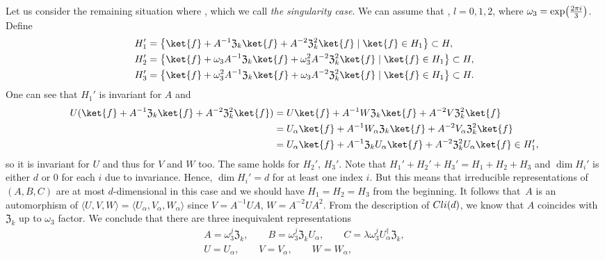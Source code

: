 \documentclass[11pt]{article}
\numberwithin{equation}{section}
\numberwithin{equation}{section}
\newcommand{\la}{\langle}
\newcommand{\ra}{\rangle}
\begin{document}
Let us consider the remaining situation
where ,
which we call \textit{the singularity case}.
We can assume that , $l=0,1,2$,
where $\omega_3 = \exp\bigl(\frac{2\pi{\rm i}}{3}\bigr)$. Define
\begin{align*}
& H_1' = \bigl\{\ket{f} + A^{-1}\mathfrak{Z}_k\ket{f} + A^{-2}\mathfrak{Z}_k^{2}\ket{f} \mid  \ket{f} \in H_1 \bigr\} \subset H, \\
 &H_2' = \bigl\{\ket{f} + \omega_3A^{-1}\mathfrak{Z}_k\ket{f} + \omega_3^2A^{-2}\mathfrak{Z}_k^{2}\ket{f} \mid  \ket{f} \in H_1 \bigr\} \subset H, \\
& H_3' = \bigl\{\ket{f} + \omega_3^2A^{-1}\mathfrak{Z}_k\ket{f} + \omega_3A^{-2}\mathfrak{Z}_k^{2}\ket{f} \mid  \ket{f} \in H_1 \bigr\} \subset H.
\end{align*}
One can see that $H_1'$ is invariant for $A$
and
\begin{align*}
 U(\ket{f} + A^{-1}\mathfrak{Z}_k\ket{f} + A^{-2}\mathfrak{Z}_k^{2}\ket{f})
 &= U \ket{f} + A^{-1}W\mathfrak{Z}_k\ket{f} + A^{-2}V\mathfrak{Z}_k^{2}\ket{f} \\
 &= U_\alpha \ket{f} + A^{-1}W_\alpha\mathfrak{Z}_k\ket{f} + A^{-2}V_\alpha\mathfrak{Z}_k^{2}\ket{f}\\
& = U_\alpha \ket{f} + A^{-1}\mathfrak{Z}_kU_\alpha\ket{f} + A^{-2}\mathfrak{Z}_k^{2}U_\alpha\ket{f}
 \in H_1',
\end{align*}
so it is invariant for $U$ and thus for $V$ and $W$ too. The same holds
for $H_2'$, $H_3'$. Note that $H_1'+H_2'+H_3' = H_1+H_2+H_3$ and $\dim H_i'$ is
either $d$ or $0$ for each $i$ due to invariance.
Hence, $\dim H_i' = d$ for at least one index $i$.
But this means that irreducible representations of $(A,B,C)$
are at most $d$-dimensional in this case and we should have $H_1=H_2=H_3$
from the beginning.
It follows that~$A$ is an automorphism of $\la U, V, W\ra = \la U_\alpha, V_\alpha, W_\alpha\ra$
since $V = A^{-1}UA$, $W = A^{-2}UA^2$.
From the description of ${\rm Cli}(d)$, we know that $A$ coincides with $\mathfrak{Z}_k$ up to $\omega_3$ factor.
We conclude that there are three inequivalent representations
\begin{gather}
 A = \omega_3^j \mathfrak{Z}_k,
 \qquad B = \omega_3^j \mathfrak{Z}_k U_\alpha,
\qquad C = \lambda \omega_3^j U_\alpha^\dag \mathfrak{Z}_k,\nonumber \\
 U = U_\alpha,
\qquad V = V_\alpha,
\qquad W = W_\alpha,\label{tri:aaasol}
\end{gather}
\end{document}
